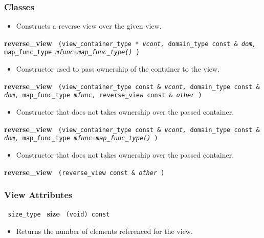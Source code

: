 \subsubsection{Classes}
\begin{itemize}
\item
Constructs a reverse view over the given view.
\end{itemize}

\noindent
\textbf{reverse\_view}%
\texttt{%
(view\_container\_type *
\textit{vcont,}%
domain\_type const \&
\textit{dom,}%
map\_func\_type
\textit{mfunc=map\_func\_type()}%
)
}

\begin{itemize}
\item
Constructor used to pass ownership of the container to the view.
\end{itemize}

\noindent
\textbf{reverse\_view}%
\texttt{%
(view\_container\_type const \&
\textit{vcont,}%
domain\_type const \&
\textit{dom,}%
map\_func\_type
\textit{mfunc,}%
reverse\_view const \&
\textit{other}%
)
}

\begin{itemize}
\item
Constructor that does not takes ownership over the passed container.
\end{itemize}

\noindent
\textbf{reverse\_view}%
\texttt{%
(view\_container\_type const \&
\textit{vcont,}%
domain\_type const \&
\textit{dom,}%
map\_func\_type
\textit{mfunc=map\_func\_type()}%
)
}

\begin{itemize}
\item
Constructor that does not takes ownership over the passed container.
\end{itemize}

\noindent
\textbf{reverse\_view}%
\texttt{%
(reverse\_view const \&
\textit{other}%
)
}

\subsubsection{ View Attributes}

\noindent
\texttt{%
size\_type
}
\newline
\textbf{size}%
\texttt{%
(void) const
}

\begin{itemize}
\item
Returns the number of elements referenced for the view.
\end{itemize}

